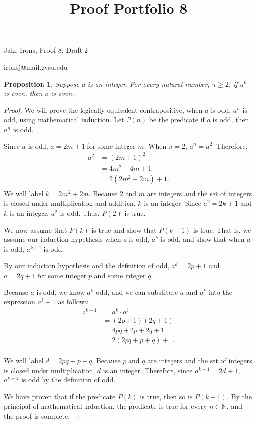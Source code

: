 \documentclass[11 pt]{article}
\title{Proof Portfolio 8}
\newtheorem{proposition}{Proposition}
\newcommand{\newpar}{\vspace{.15in}\noindent}
\begin{document}
\noindent Jake Irons, Proof 8, Draft 2

\noindent ironsj@mail.gvsu.edu

\newpar
\begin{proposition}
Suppose $a$ is an integer. For every natural number, $n\geq2$, if $a^n$ is even, then $a$ is even.
\end{proposition}
\begin{proof}
We will prove the logically equivalent contrapositive, when $a$ is odd, $a^n$ is odd, using mathematical induction. Let $P(n)$ be the predicate if $a$ is odd, then $a^n$ is odd.

\newpar
Since $a$ is odd, $a=2m+1$ for some integer $m$. When $n=2$, $a^n=a^2$. Therefore,
\begin{align*}
a^2&=(2m+1)^2 \\
&=4m^2+4m+1 \\
&=2(2m^2+2m)+1. \\
\end{align*}
We will label $k=2m^2+2m$. Because 2 and $m$ are integers and the set of integers is closed under multiplication and addition, $k$ is an integer. Since $a^2=2k+1$ and $k$ is an integer, $a^2$ is odd. Thus, $P(2)$ is true.

\newpar
We now assume that $P(k)$ is true and show that $P(k+1)$ is true. That is, we assume our induction hypothesis when $a$ is odd, $a^k$ is odd, and show that when $a$ is odd, $a^{k+1}$ is odd.

\newpar By our induction hypothesis and the definition of odd, $a^k=2p+1$ and $a=2q+1$ for some integer $p$ and some integer $q$.

\newpar Because $a$ is odd, we know $a^k$ odd, and we can substitute $a$ and $a^k$ into the expression $a^k+1$ as follows:
\begin{align*}
a^{k+1}&=a^k\cdot a^1 \\
&=(2p+1)(2q+1) \\
&=4pq+2p+2q+1 \\
&=2(2pq+p+q)+1. \\
\end{align*}

\newpar
We will label $d=2pq+p+q$. Because $p$ and $q$ are integers and the set of integers is closed under multiplication, $d$ is an integer. Therefore, since $a^{k+1}=2d+1$, $a^{k+1}$ is odd by the definition of odd.

\newpar We have proven that if the predicate $P(k)$ is true, then so is $P(k+1)$. By the principal of mathematical induction, the predicate is true for every $n\in{\mathbb{N}}$, and the proof is complete.
\end{proof}
\end{document}
